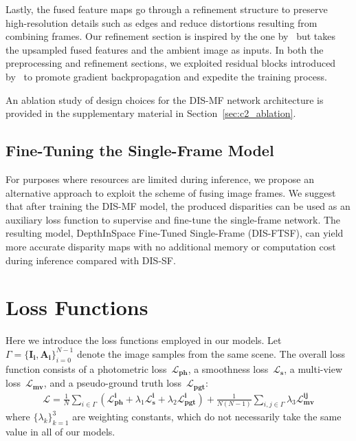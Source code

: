 Lastly, the fused feature maps go through a refinement structure to preserve high-resolution details such as edges and reduce distortions resulting from combining frames. Our refinement section is inspired by the one by~\cite{zhang2018activestereonet} but takes the upsampled fused features and the ambient image as inputs. In both the preprocessing and refinement sections, we exploited residual blocks introduced by~\cite{he2016deep} to promote gradient backpropagation and expedite the training process.

An ablation study of design choices for the DIS-MF network architecture is provided in the supplementary material in Section~\ref{sec:c2_ablation}.

\subsection{Fine-Tuning the Single-Frame Model} \label{sec:c2_fine-tuned}

For purposes where resources are limited during inference, we propose an alternative approach to exploit the scheme of fusing image frames. We suggest that after training the DIS-MF model, the produced disparities can be used as an auxiliary loss function to supervise and fine-tune the single-frame network. The resulting model, DepthInSpace Fine-Tuned Single-Frame (DIS-FTSF), can yield more accurate disparity maps with no additional memory or computation cost during inference compared with DIS-SF.

\section{Loss Functions}\label{sec:c2_loss}

Here we introduce the loss functions employed in our models. Let $\Gamma=\{\boldsymbol{I_{i}}, \boldsymbol{A_{i}}\}_{i=0}^{N-1}$ denote the image samples from the same scene. The overall loss function consists of a photometric loss~$\boldsymbol{\mathcal{L}_{ph}}$, a smoothness loss~$\boldsymbol{\mathcal{L}_s}$, a multi-view loss~$\boldsymbol{\mathcal{L}_{mv}}$, and a pseudo-ground truth loss~$\boldsymbol{\mathcal{L}_{pgt}}$:
\begin{align}
    \boldsymbol{\mathcal{L}} = \frac{1}{N}\sum_{i \in \Gamma} (\boldsymbol{\mathcal{L}^{i}_{ph}} + \lambda_{1}\boldsymbol{\mathcal{L}^{i}_{s}} + \lambda_{2}\boldsymbol{\mathcal{L}^{i}_{pgt}}) + \frac{1}{N(N-1)}\sum_{i,j \in \Gamma} \lambda_{3}\boldsymbol{\mathcal{L}^{ij}_{mv}}
\end{align}
where $\{\lambda_{k}\}_{k=1}^{3}$ are weighting constants, which do not necessarily take the same value in all of our models.

